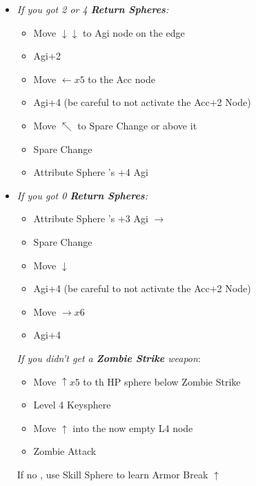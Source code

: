 \begin{spheregrid}
    \begin{itemize}
        \item \textit{If you got 2 or 4 \textbf{Return Spheres}:}
        \begin{itemize}
            \item Move $\downarrow\downarrow$ to Agi node on the edge
            \item Agi+2
            \item Move $\leftarrow x5$ to the Acc node
            \item Agi+4 (be careful to not activate the Acc+2 Node)
            \item Move $\nwarrow$ to Spare Change or above it
            \item Spare Change
            \item Attribute Sphere \kimahri's +4 Agi
        \end{itemize}
        \item \textit{If you got 0 \textbf{Return Spheres}:}
        \begin{itemize}
            \item Attribute Sphere \rikku's +3 Agi $\rightarrow$
            \item Spare Change
            \item Move $\downarrow$
            \item Agi+4 (be careful to not activate the Acc+2 Node)
            \item Move $\rightarrow x6$
            \item Agi+4
        \end{itemize}
        \tidusf \textit{If you didn't get a \textbf{Zombie Strike} weapon}:
        \begin{itemize}
            \item Move $\uparrow x5$ to th HP sphere below Zombie Strike
            \item Level 4 Keysphere
            \item Move $\uparrow$ into the now empty L4 node
            \item Zombie Attack
        \end{itemize}
        \rikkuf If no \od, use Skill Sphere to learn Armor Break $\uparrow$
    \end{itemize}
\end{spheregrid}
